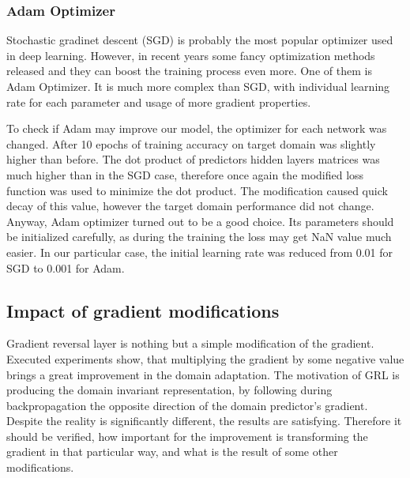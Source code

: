 \documentclass{article}
\begin{document}
\subsubsection{Adam Optimizer}
Stochastic gradinet descent (SGD) is probably the most popular optimizer used in deep learning. However, in recent years some fancy optimization methods released and they can boost the training process even more. One of them is Adam Optimizer. It is much more complex than SGD, with individual learning rate for each parameter and usage of more gradient properties. 
\par
To check if Adam may improve our model, the optimizer for each network was changed. After 10 epochs of training accuracy on target domain was slightly higher than before. The dot product of predictors hidden layers matrices was much higher than in the SGD case, therefore once again the modified loss function was used to minimize the dot product. The modification caused quick decay of this value, however the target domain performance did not change. Anyway, Adam optimizer turned out to be a good choice. Its parameters should be initialized carefully, as during the training the loss may get NaN value much easier. In our particular case, the initial learning rate was reduced from 0.01 for SGD to 0.001 for Adam.

\subsection{Impact of gradient modifications}
Gradient reversal layer is nothing but a simple modification of the gradient. Executed experiments show, that multiplying the gradient by some negative value brings a great improvement in the domain adaptation. The motivation of GRL is producing the domain invariant representation, by following during backpropagation the opposite direction of the domain predictor's gradient. Despite the reality is significantly different, the results are satisfying. Therefore it should be verified, how important for the improvement is transforming the gradient in that particular way, and what is the result of some other modifications.
\end{document}
